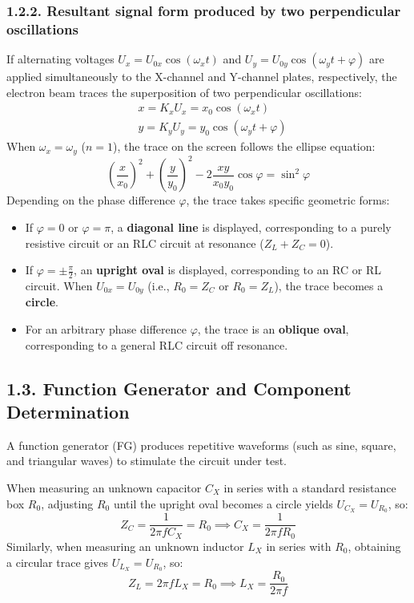 \documentclass[12pt,oneside,a4paper]{article}
\theoremstyle{definition}
\begin{document}
	\subsubsection*{1.2.2. Resultant signal form produced by two perpendicular oscillations}
	If alternating voltages $U_x = U_{0x} \cos(\omega_x t)$ and $U_y = U_{0y} \cos(\omega_y t + \varphi)$ are applied simultaneously to the X-channel and Y-channel plates, respectively, the electron beam traces the superposition of two perpendicular oscillations:
	\begin{equation}
		\begin{aligned}
			&x = K_x U_x = x_0 \cos(\omega_x t) \\
			&y = K_y U_y = y_0 \cos(\omega_y t + \varphi)
		\end{aligned}
	\end{equation}
	When $\omega_x = \omega_y$ ($n = 1$), the trace on the screen follows the ellipse equation:
	\begin{equation}
		\left(\frac{x}{x_0}\right)^2 + \left(\frac{y}{y_0}\right)^2 - 2\frac{xy}{x_0 y_0}\cos\varphi = \sin^2\varphi
	\end{equation}
	Depending on the phase difference $\varphi$, the trace takes specific geometric forms:
	\begin{itemize}[leftmargin=1.5em]
		\item If $\varphi = 0$ or $\varphi = \pi$, a \textbf{diagonal line} is displayed, corresponding to a purely resistive circuit or an RLC circuit at resonance ($Z_L + Z_C = 0$).
		\item If $\varphi = \pm \frac{\pi}{2}$, an \textbf{upright oval} is displayed, corresponding to an RC or RL circuit. When $U_{0x} = U_{0y}$ (i.e., $R_0 = Z_C$ or $R_0 = Z_L$), the trace becomes a \textbf{circle}.
		\item For an arbitrary phase difference $\varphi$, the trace is an \textbf{oblique oval}, corresponding to a general RLC circuit off resonance.
	\end{itemize}
	
	\subsection*{1.3. Function Generator and Component Determination}
	A function generator (FG) produces repetitive waveforms (such as sine, square, and triangular waves) to stimulate the circuit under test.
	
	\vspace{0.5cm}
	\hspace{-0.73cm}
	When measuring an unknown capacitor $C_X$ in series with a standard resistance box $R_0$, adjusting $R_0$ until the upright oval becomes a circle yields $U_{C_X} = U_{R_0}$, so:
	\begin{equation}
		Z_C = \frac{1}{2\pi f C_X} = R_0 \implies C_X = \frac{1}{2\pi f R_0}
	\end{equation}
	Similarly, when measuring an unknown inductor $L_X$ in series with $R_0$, obtaining a circular trace gives $U_{L_X} = U_{R_0}$, so:
	\begin{equation}
		Z_L = 2\pi f L_X = R_0 \implies L_X = \frac{R_0}{2\pi f}
	\end{equation}
	
\end{document}
